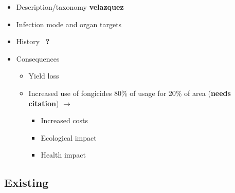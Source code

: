 \documentclass[english]{article}
\begin{document}
\begin{itemize}
	\item Description/taxonomy \textbf{velazquez}
	\item Infection mode and organ targets
	\item History~\parencite{fontaineEuropeBridgeheadWorldwide2021} \textbf{?}
	\item Consequences
	      \begin{itemize}
		      \item Yield loss
		      \item Increased use of fongicides 80\% of usage for 20\% of area (\textbf{needs citation}) $\rightarrow$
		            \begin{itemize}
			            \item Increased costs
			            \item Ecological impact
			            \item Health impact
		            \end{itemize}
	      \end{itemize}
\end{itemize}

\subsection{Existing}
\end{document}
